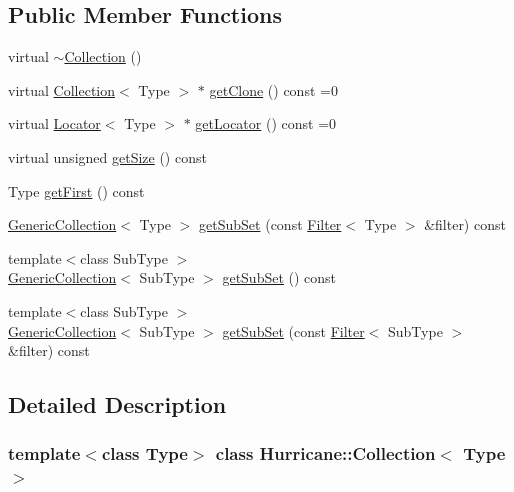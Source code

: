 \subsection*{Public Member Functions}
\begin{DoxyCompactItemize}
\item 
virtual \hyperlink{classHurricane_1_1Collection_aafcf8e05658e245b2a762baa7a59f281}{$\sim$\+Collection} ()
\item 
virtual \hyperlink{classHurricane_1_1Collection}{Collection}$<$ Type $>$ $\ast$ \hyperlink{classHurricane_1_1Collection_ac75b91d3952b36e14f21174958523924}{get\+Clone} () const =0
\item 
virtual \hyperlink{classHurricane_1_1Locator}{Locator}$<$ Type $>$ $\ast$ \hyperlink{classHurricane_1_1Collection_a48fd1a0a2b6d2530a87e22ba65aa3152}{get\+Locator} () const =0
\item 
virtual unsigned \hyperlink{classHurricane_1_1Collection_a1292aabe88c9aadfdfe21dabddb62c19}{get\+Size} () const
\item 
Type \hyperlink{classHurricane_1_1Collection_a846a042646e02a0f77d2ce0f6190288a}{get\+First} () const
\item 
\hyperlink{classHurricane_1_1GenericCollection}{Generic\+Collection}$<$ Type $>$ \hyperlink{classHurricane_1_1Collection_aa32ea7249d57ee05e3c71dcde8106832}{get\+Sub\+Set} (const \hyperlink{classHurricane_1_1Filter}{Filter}$<$ Type $>$ \&filter) const
\item 
{\footnotesize template$<$class Sub\+Type $>$ }\\\hyperlink{classHurricane_1_1GenericCollection}{Generic\+Collection}$<$ Sub\+Type $>$ \hyperlink{classHurricane_1_1Collection_a91d986e21395d4021d927e06f204ab6c}{get\+Sub\+Set} () const
\item 
{\footnotesize template$<$class Sub\+Type $>$ }\\\hyperlink{classHurricane_1_1GenericCollection}{Generic\+Collection}$<$ Sub\+Type $>$ \hyperlink{classHurricane_1_1Collection_a673afd14782da82ad03a68366ae1f09b}{get\+Sub\+Set} (const \hyperlink{classHurricane_1_1Filter}{Filter}$<$ Sub\+Type $>$ \&filter) const
\end{DoxyCompactItemize}


\subsection{Detailed Description}
\subsubsection*{template$<$class Type$>$\newline
class Hurricane\+::\+Collection$<$ Type $>$}

